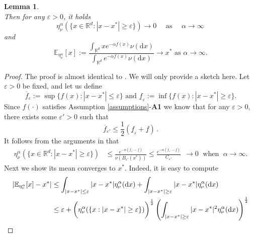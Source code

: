 \documentclass[reqno]{amsart}
\numberwithin{algorithm}{section}
\newcommand{\diff}{\mathrm{d}}
\newcommand{\dd}{\mathrm{d}}
\newcommand{\RR}{\mathbb{R}}
\newcommand{\EE}{{\mathbb E}}
\newtheorem{lemma}[theorem]{Lemma}
\begin{document}
{\begin{lemma}
\begin{equation}
    \end{equation}
    Then for any $\varepsilon>0$, it holds 
    \begin{equation}\label{eq: massconv}
        \eta_\nu^\alpha(\{x \in \RR^d :|x-x^*|\geq \varepsilon\})\longrightarrow 0  \quad \mbox{ as }  \quad \alpha \to \infty\,
    \end{equation}
and
    \begin{equation}\label{eq: meanconv}
       \EE_{\eta_\nu^\alpha}[x]:= \frac{\int_{\RR^d} x e^{-\alpha f(x)}\nu(\diff x)}{\int_{\RR^d}e^{-\alpha f(x)}\nu(\diff x)}\to x^*\mbox{ as }\alpha\to\infty.
    \end{equation}
\end{lemma}
\begin{proof}
The proof is almost identical to \cite[Theorem 3.3, Corollary 3.4]{huang2025faithful}. We will only provide a sketch here. Let $\varepsilon>0$ be fixed, and let us define
\begin{equation*}
    \overline f_\varepsilon:=\sup\{f(x): |x-x^*|\leq \varepsilon\} \mbox{ and } \underline f_\varepsilon:=\inf\{f(x): |x-x^*|\geq \varepsilon\}. 
\end{equation*}
Since $f(\cdot)$ satisfies Assumption \ref{assumptions}-\textbf{A1} we know that for any $\varepsilon>0$, there exists some $\varepsilon'>0$ such that
\begin{equation}\label{diff f eps}
    \overline f_{\varepsilon'} \leq \frac{1}{2} (\underline f_\varepsilon + \underline f)\,.
\end{equation}
It follows from the arguments in \cite[Theorem 3.3]{huang2025faithful} that 
\begin{align}\label{massconverge}
    \eta_\nu^\alpha(\{x \in \RR^d :|x-x^*|\geq \varepsilon\} )
   &\leq \frac{e^{-\alpha (\overline f_{\varepsilon'} - \underline f)}}{\nu(B_{\varepsilon'}(x^*))}\leq \frac{e^{-\alpha (\overline f_{\varepsilon'} - \underline f)}}{C_{\varepsilon'}}\,\; \to 0 \; \mbox{ when } \;\alpha \to \infty.
\end{align}
Next we show its mean converges to $x^*$. Indeed, it is easy to compute
\begin{align}\label{distx*}
    |\EE_{\eta_\nu^\alpha}[x]-x^*|&\leq \int_{|x-x^*|\leq \varepsilon}|x-x^*|\eta_\nu^\alpha(\dd x)+\int_{|x-x^*|\geq \varepsilon}|x-x^*|\eta_\nu^\alpha(\dd x)\notag\\
  &\leq \varepsilon+ \bigg(\eta_\nu^\alpha(\{x:|x-x^*|\geq \varepsilon\}) \bigg)^{\frac{1}{2}} \left(\int_{|x-x^*|\geq \varepsilon}|x-x^*|^2\eta_\nu^\alpha(\dd x) \right)^{\frac{1}{2}}\notag\\

\end{align}
\end{proof}}
\end{document}
